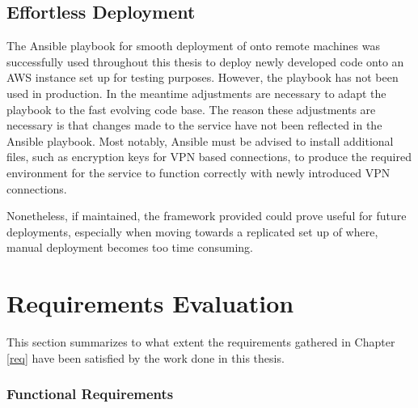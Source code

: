 
\subsection{Effortless Deployment}
\label{eva:deploy}

The Ansible playbook for smooth deployment of \lcs onto remote machines was successfully used throughout this thesis to deploy newly developed code onto an AWS instance set up for testing purposes. However, the playbook has not been used in production. In the meantime adjustments are necessary to adapt the playbook to the fast evolving \lcs code base. The reason these adjustments are necessary is that changes made to the service have not been reflected in the Ansible playbook. Most notably, Ansible must be advised to install additional files, such as encryption keys for VPN based connections, to produce the required environment for the service to function correctly with newly introduced VPN connections. 

Nonetheless, if maintained, the framework provided could prove useful for future deployments, especially when moving towards a replicated set up of \lcs where, manual deployment becomes too time consuming.

\section{Requirements Evaluation}

This section summarizes to what extent the requirements gathered in Chapter \ref{req} have been satisfied by the work done in this thesis.

\subsubsection{Functional Requirements}

